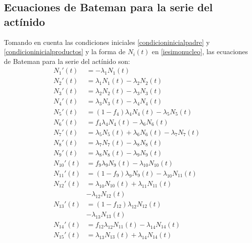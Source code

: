 \subsection{Ecuaciones de Bateman para la serie del actínido}
Tomando en cuenta las condiciones iniciales \ref{condicioninicialpadre} y \ref{condicioninicialproductos} y la forma de $N_i(t)$ en \ref{iesimonucleo}, las ecuaciones de Bateman para la serie del actínido son:
\begin{align}
    N_1'(t)&=-\lambda_1 N_1(t)\\ \label{ecubateman1} %
    N_2'(t)&=\lambda_1 N_1(t) -\lambda_2 N_2(t)\\ %
    N_3'(t)&=\lambda_2 N_2(t) -\lambda_3 N_3(t)\\ %
    N_4'(t)&=\lambda_3 N_3(t) -\lambda_4 N_4(t)\\ %
    N_5'(t)&=(1-f_4)\lambda_4 N_4(t) -\lambda_5 N_5(t)\\ %
    N_6'(t)&=f_4 \lambda_4 N_4(t) -\lambda_6 N_6(t)\\ %
    N_7'(t)&=\lambda_5 N_5(t) + \lambda_6 N_6(t) -\lambda_7 N_7(t)\\ %
    N_8'(t)&=\lambda_7 N_7(t) -\lambda_8 N_8(t)\\ %
    N_9'(t)&=\lambda_8 N_8(t) -\lambda_9 N_9(t)\\ %
    N_{10}'(t)&=f_9\lambda_9 N_9(t) -\lambda_{10} N_{10}(t)\\ %
    N_{11}'(t)&=(1-f_9)\lambda_9 N_9(t) -\lambda_{10} N_{11}(t)\\%
   N_{12}'(t)&=\lambda_{10} N_{10}(t) +\lambda_{11} N_{11}(t)\\
   &-\lambda_{12} N_{12}(t)\\ %
    N_{13}'(t)&=(1-f_{12})\lambda_{12} N_{12}(t)\\
    & -\lambda_{13} N_{13}(t)\\ %
    N_{14}'(t)&=f_{12}\lambda_{12}N_{11}(t) -\lambda_{14} N_{14}(t)\\ %
    N_{15}'(t)&=\lambda_{13} N_{13}(t) + \lambda_{14} N_{14}(t) %
    \label{ecubateman15}
\end{align}

